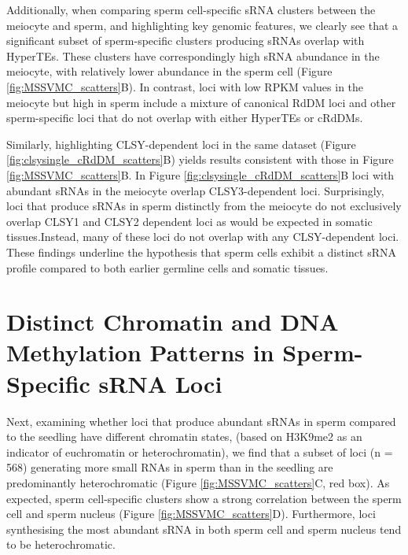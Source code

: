 Additionally, when comparing sperm cell-specific sRNA clusters between the meiocyte and sperm, and highlighting key genomic features, we clearly see that a significant subset of sperm-specific clusters producing sRNAs overlap with HyperTEs. These clusters have correspondingly high sRNA abundance in the meiocyte, with relatively lower abundance in the sperm cell (Figure \ref{fig:MSSVMC_scatters}B). In contrast, loci with low RPKM values in the meiocyte but high in sperm include a mixture of canonical RdDM loci and other sperm-specific loci that do not overlap with either HyperTEs or cRdDMs.

Similarly, highlighting CLSY-dependent loci in the same dataset (Figure \ref{fig:clsysingle_cRdDM_scatters}B) yields results consistent with those in Figure \ref{fig:MSSVMC_scatters}B. In Figure \ref{fig:clsysingle_cRdDM_scatters}B loci with abundant sRNAs in the meiocyte overlap CLSY3-dependent loci. Surprisingly, loci that produce sRNAs in sperm distinctly from the meiocyte do not exclusively overlap CLSY1 and CLSY2 dependent loci as would be expected in somatic tissues.Instead, many of these loci do not overlap with any CLSY-dependent loci. These findings underline the hypothesis that sperm cells exhibit a distinct sRNA profile compared to both earlier germline cells and somatic tissues.

\section{Distinct Chromatin and DNA Methylation Patterns in Sperm-Specific sRNA Loci}

Next, examining whether loci that produce abundant sRNAs in sperm compared to the seedling have different chromatin states, (based on H3K9me2 as an indicator of euchromatin or heterochromatin), we find that a subset of loci (n = 568) generating more small RNAs in sperm than in the seedling are predominantly heterochromatic (Figure \ref{fig:MSSVMC_scatters}C, red box). As expected, sperm cell-specific clusters show a strong correlation between the sperm cell and sperm nucleus (Figure \ref{fig:MSSVMC_scatters}D). Furthermore, loci synthesising the most abundant sRNA in both sperm cell and sperm nucleus tend to be heterochromatic.

